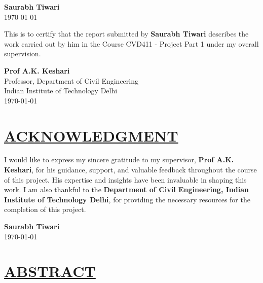 \documentclass[a4paper,12pt]{report}
\begin{document}
\vspace{2cm}

\begin{raggedleft}

\textbf{Saurabh Tiwari} \\
\today

\end{raggedleft}

\vspace{2cm}

This is to certify that the report submitted by \textbf{Saurabh Tiwari} describes the work carried out by him in the Course CVD411 - Project Part 1 under my overall supervision.

\vspace{2cm}

\begin{raggedleft}

\textbf{Prof A.K. Keshari} \\
Professor, Department of Civil Engineering \\
Indian Institute of Technology Delhi \\
\today

\end{raggedleft}


\chapter*{\centering \underline{ACKNOWLEDGMENT}}


I would like to express my sincere gratitude to my supervisor, \textbf{Prof A.K. Keshari}, for his guidance, support, and valuable feedback throughout the course of this project. His expertise and insights have been invaluable in shaping this work. I am also thankful to the \textbf{Department of Civil Engineering, Indian Institute of Technology Delhi}, for providing the necessary resources for the completion of this project.

\vspace{2cm}

\begin{raggedleft}

\textbf{Saurabh Tiwari} \\
\today

\end{raggedleft}


\chapter*{\centering \underline{ABSTRACT}}
\end{document}
